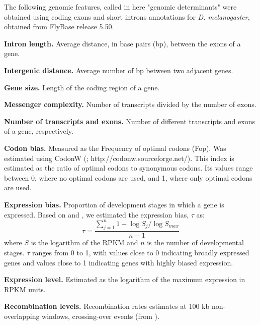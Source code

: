 The following genomic features, called in here "genomic determinants" were obtained using coding exons and short introns annotations for \textit{D. melanogaster}, obtained from FlyBase release 5.50. 

\textbf{Intron length.} Average distance, in base pairs (bp), between the exons of a gene.

\textbf{Intergenic distance.} Average number of bp between two adjacent genes.

\textbf{Gene size.} Length of the coding region of a gene.

\textbf{Messenger complexity.} Number of transcripts divided by the number of exons.

\textbf{Number of transcripts and exons.} Number of different transcripts and exons of a gene, respectively.

\textbf{Codon bias.} Measured as the Frequency of optimal codons (Fop). Was estimated using CodonW (\citealp{Peden1999}; http://codonw.sourceforge.net/).
This index is estimated as the ratio of optimal codons to synonymous codons. Its values range between 0, where no optimal codons are used, and 1, where only optimal codons are used.

\textbf{Expression bias.} Proportion of development stages in which a gene is expressed. Based on \citep{Yanai2005} and \citep{Larracuente2008}, we estimated the expression bias, $\tau$ as:
%
$$ \tau = \frac{ \sum_{j=1}^{n} 1- \log S_{j} / \log S_{max} }  { n-1 } $$
%
where $S$ is the logarithm of the RPKM and $n$ is the number of developmental stages. $\tau$ ranges from 0 to 1, with values close to 0 indicating broadly expressed genes and values close to 1 indicating genes with highly biased expression.

\textbf{Expression level.} Estimated as the logarithm of the maximum expression in RPKM units.

\textbf{Recombination levels.} Recombination rates estimates at 100 kb non-overlapping windows, crossing-over events (from \citealp{Comeron2012}).
